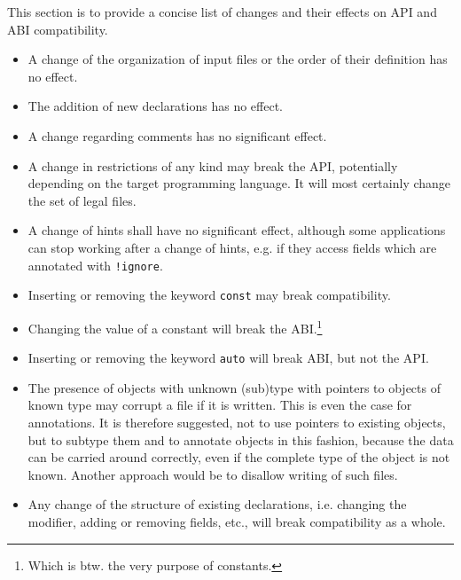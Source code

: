 \documentclass[a4paper,10pt]{article}
\begin{document}
This section is to provide a concise list of changes and their effects on API and ABI compatibility.

\begin{itemize}
 \item A change of the organization of input files or the order of their definition has no effect.

 \item The addition of new declarations has no effect.

 \item A change regarding comments has no significant effect.

 \item A change in restrictions of any kind may break the API, potentially depending on the target programming language. It will most certainly change the set of legal files.

 \item A change of hints shall have no significant effect, although some applications can stop working after a change of hints, e.g. if they access fields which are annotated with \verb/!ignore/.

 \item Inserting or removing the keyword \texttt{const} may break compatibility.

 \item Changing the value of a constant will break the ABI.\footnote{Which is btw. the very purpose of constants.}

 \item Inserting or removing the keyword \texttt{auto} will break ABI, but not the API.

 \item The presence of objects with unknown (sub)type with pointers to objects of known type may corrupt a file if it is written. This is even the case for annotations. It is therefore suggested, not to use pointers to existing objects, but to subtype them and to annotate objects in this fashion, because the data can be carried around correctly, even if the complete type of the object is not known. Another approach would be to disallow writing of such files.

 \item Any change of the structure of existing declarations, i.e. changing the modifier, adding or removing fields, etc., will break compatibility as a whole.
\end{itemize}
\end{document}
